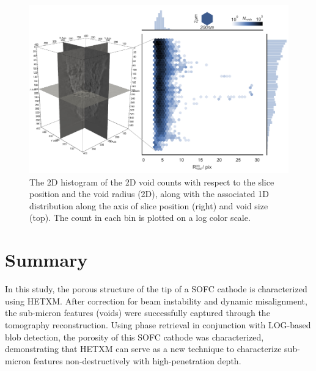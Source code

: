 \documentclass[12pt]{scrartcl}
\newcommand{\myscale}{1}
\begin{document}
\renewcommand{\myscale}{1.0}
\begin{figure}[htp]
\centering
\includegraphics[scale=\myscale]{void_profile}
\caption{
The 2D histogram of the 2D void counts with respect to the slice position and the void radius (2D), along with the associated 1D distribution along the axis of slice position (right) and void size (top). 
The count in each bin is plotted on a log color scale.
}\label{fig: void profile}
\end{figure}


\section{Summary}\label{sec: summary}

In this study, the porous structure of the tip of a SOFC cathode is characterized using HETXM.
After correction for beam instability and dynamic misalignment, the sub-micron features (voids) were successfully captured through the tomography reconstruction.
Using phase retrieval in conjunction with LOG-based blob detection, the porosity of this SOFC cathode was characterized, demonstrating that HETXM can serve as a new technique to characterize sub-micron features non-destructively with high-penetration depth. 



\end{document}
